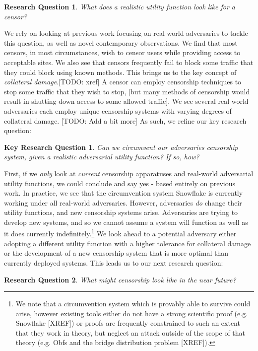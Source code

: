 \documentclass[12pt]{report}
\newtheorem{question}{Research Question}
\newtheorem*{keyq}{Key Research Question}
\begin{document}
\begin{question}
What does a realistic utility function look like for a censor?
\end{question}

We rely on looking at previous work focusing on real world adversaries to tackle this question, as well as novel contemporary observations. We find that most censors, in most circumstances, wish to censor users while providing access to acceptable sites. We also see that censors frequently fail to block some traffic that they could block using known methods. This brings us to the key concept of \emph{collateral damage}.[TODO: xref] A censor can employ censorship techniques to stop some traffic that they wish to stop, [but many methods of censorship would result in shutting down access to some allowed traffic]. We see several real world adversaries each employ unique censorship systems with varying degrees of collateral damage. [TODO: Add a bit more] As such, we refine our key research question:

\begin{keyq}
Can we circumvent our adversaries censorship system, given a realistic adversarial utility function? If so, how?
\end{keyq}

First, if we \emph{only} look at \emph{current} censorship apparatuses and real-world adversarial utility functions, we could conclude and say yes - based entirely on previous work. In practice, we see that the circumvention system Snowflake is currently working under all real-world adversaries. However, adversaries \emph{do} change their utility functions, and new censorship systems arise. Adversaries are trying to develop new systems, and so we cannot assume a system will function as well as it does currently indefinitely.\footnote{We note that a circumvention system which is provably able to survive could arise, however existing tools either do not have a strong scientific proof (e.g. Snowflake [XREF]) or proofs are frequently constrained to such an extent that they work in theory, but neglect an attack outside of the scope of that theory (e.g. Obfs and the bridge distribution problem [XREF]).} We look ahead to a potential adversary either adopting a different utility function with a higher tolerance for collateral damage or the development of a new censorship system that is more optimal than currently deployed systems. This leads us to our next research question:

\begin{question}
What might censorship look like in the near future?
\end{question}
\end{document}
